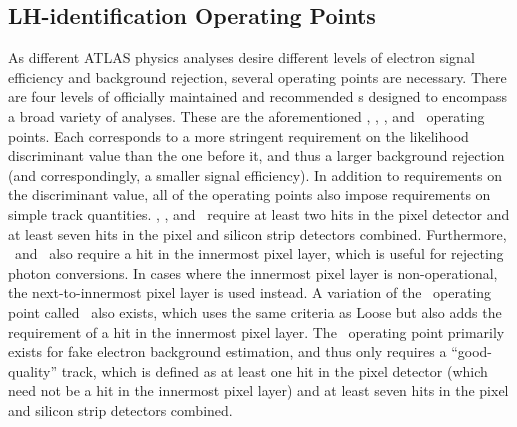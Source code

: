 \subsection{LH-identification Operating Points}
As different ATLAS physics analyses desire different levels of electron signal efficiency and background rejection, several operating points are necessary.
There are four levels of officially maintained and recommended \tune\textrm{s} designed to encompass a broad variety of analyses.
These are the aforementioned \VeryLoose, \Loose, \Medium, and \Tight\ operating points.
Each corresponds to a more stringent requirement on the likelihood discriminant value than the one before it, and thus a larger background rejection (and correspondingly,
a smaller signal efficiency).
In addition to requirements on the discriminant value, all of the operating points also impose requirements on simple track quantities.
\Loose, \Medium, and \Tight\ require at least two hits in the pixel detector and at least seven hits in the pixel and silicon strip detectors combined.
Furthermore, \Medium\ and \Tight\ also require a hit in the innermost pixel layer, which is useful for rejecting photon conversions.
In cases where the innermost pixel layer is non-operational, the next-to-innermost pixel layer is used instead.
A variation of the \Loose\ operating point called \LooseAndBLayer\ also exists, which uses the same criteria as Loose but also adds the requirement of a hit in the innermost pixel layer.
The \VeryLoose\ operating point primarily exists for fake electron background estimation, and thus only requires a ``good-quality'' track, which is defined as at least one hit in the pixel detector (which need not be a hit in the innermost pixel layer) and at least seven hits in the pixel and silicon strip detectors combined.

